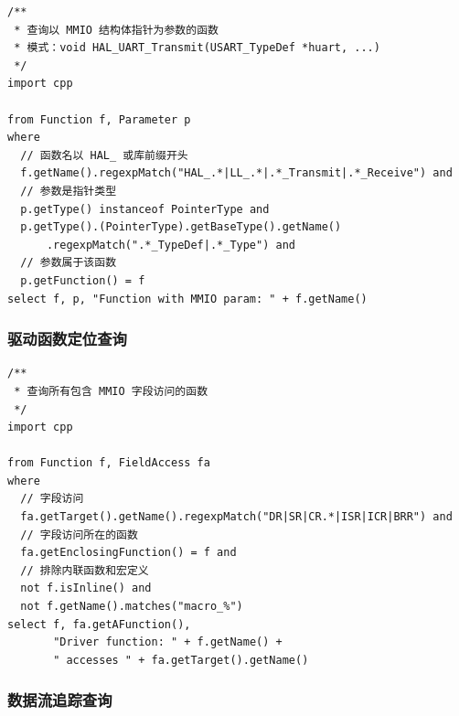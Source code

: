 \begin{lstlisting}[style=CStyle,abovecaptionskip=0pt,belowcaptionskip=0pt]
/**
 * 查询以 MMIO 结构体指针为参数的函数
 * 模式：void HAL_UART_Transmit(USART_TypeDef *huart, ...)
 */
import cpp

from Function f, Parameter p
where
  // 函数名以 HAL_ 或库前缀开头
  f.getName().regexpMatch("HAL_.*|LL_.*|.*_Transmit|.*_Receive") and
  // 参数是指针类型
  p.getType() instanceof PointerType and
  p.getType().(PointerType).getBaseType().getName()
      .regexpMatch(".*_TypeDef|.*_Type") and
  // 参数属于该函数
  p.getFunction() = f
select f, p, "Function with MMIO param: " + f.getName()
\end{lstlisting}

\subsubsection{驱动函数定位查询}

\begin{lstlisting}[style=CStyle,abovecaptionskip=0pt,belowcaptionskip=0pt]
/**
 * 查询所有包含 MMIO 字段访问的函数
 */
import cpp

from Function f, FieldAccess fa
where
  // 字段访问
  fa.getTarget().getName().regexpMatch("DR|SR|CR.*|ISR|ICR|BRR") and
  // 字段访问所在的函数
  fa.getEnclosingFunction() = f and
  // 排除内联函数和宏定义
  not f.isInline() and
  not f.getName().matches("macro_%")
select f, fa.getAFunction(),
       "Driver function: " + f.getName() +
       " accesses " + fa.getTarget().getName()
\end{lstlisting}

\subsubsection{数据流追踪查询}

